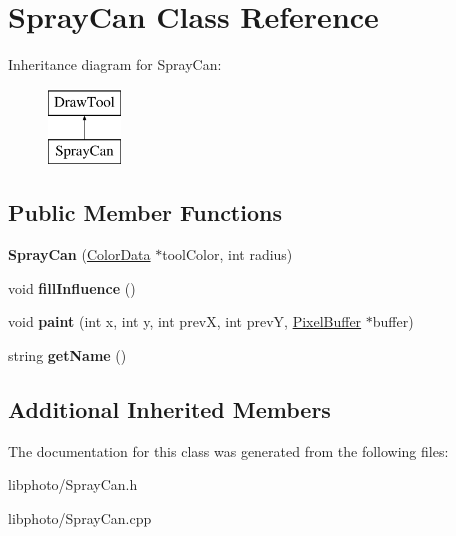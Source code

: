 \hypertarget{classSprayCan}{\section{Spray\-Can Class Reference}
\label{classSprayCan}
}
Inheritance diagram for Spray\-Can\-:\begin{figure}[H]
\begin{center}
\leavevmode
\includegraphics[height=2.000000cm]{classSprayCan}
\end{center}
\end{figure}
\subsection*{Public Member Functions}
\begin{DoxyCompactItemize}
\item 
\hypertarget{classSprayCan_a5491c5e7346fb7126b45405664b22f5d}{{\bfseries Spray\-Can} (\hyperlink{classColorData}{Color\-Data} $\ast$tool\-Color, int radius)}\label{classSprayCan_a5491c5e7346fb7126b45405664b22f5d}

\item 
\hypertarget{classSprayCan_a86321320d34fdc49c754ce6d1ff324fd}{void {\bfseries fill\-Influence} ()}\label{classSprayCan_a86321320d34fdc49c754ce6d1ff324fd}

\item 
\hypertarget{classSprayCan_ade6115cd8e7f277c74b0c6ade3547e2c}{void {\bfseries paint} (int x, int y, int prev\-X, int prev\-Y, \hyperlink{classPixelBuffer}{Pixel\-Buffer} $\ast$buffer)}\label{classSprayCan_ade6115cd8e7f277c74b0c6ade3547e2c}

\item 
\hypertarget{classSprayCan_a6be9bc1725f16fdb0e6f3610fe60e22c}{string {\bfseries get\-Name} ()}\label{classSprayCan_a6be9bc1725f16fdb0e6f3610fe60e22c}

\end{DoxyCompactItemize}
\subsection*{Additional Inherited Members}


The documentation for this class was generated from the following files\-:\begin{DoxyCompactItemize}
\item 
libphoto/Spray\-Can.\-h\item 
libphoto/Spray\-Can.\-cpp\end{DoxyCompactItemize}

